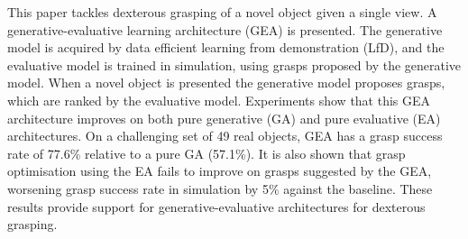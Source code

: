 This paper tackles dexterous grasping of a novel object given a single view. A generative-evaluative learning architecture (GEA) is presented. The generative model is acquired by data efficient learning from demonstration (LfD), and the evaluative model is trained in simulation, using grasps proposed by the generative model. When a novel object is presented the generative model proposes grasps, which are ranked by the evaluative model. Experiments show that this GEA architecture improves on both pure generative (GA) and pure evaluative (EA) architectures. On a challenging set of 49 real objects, GEA has a grasp success rate of 77.6\% relative to a pure GA (57.1\%). It is also shown that grasp optimisation using the EA fails to improve on grasps suggested by the GEA, worsening grasp success rate in simulation by 5\% against the baseline. These results provide support for generative-evaluative architectures for dexterous grasping.